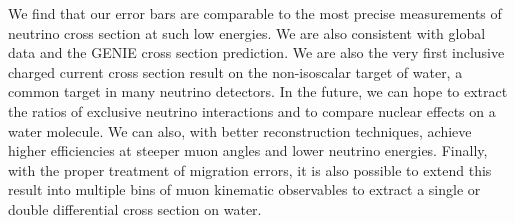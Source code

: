 We find that our error bars are comparable to the most precise measurements of neutrino cross section at such low energies. We are also consistent with global data and the GENIE cross section prediction. We are also the very first inclusive charged current cross section result on the non-isoscalar target of water, a common target in many neutrino detectors. In the future, we can hope to extract the ratios of exclusive neutrino interactions and to compare nuclear effects on a water molecule. We can also, with better reconstruction techniques, achieve higher efficiencies at steeper muon angles and lower neutrino energies. Finally, with the proper treatment of migration errors, it is also possible to extend this result into multiple bins of muon kinematic observables to extract a single or double differential cross section on water.
